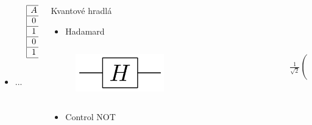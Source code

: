 \documentclass{beamer}
\begin{document}
\begin{frame}
\begin{columns}[t]
\begin{column}{.5\textwidth}
\begin{columns}[c]
\begin{column}{.5\textwidth}
\begin{figure}
					\end{figure}
				\end{column}
				\begin{column}{.5\textwidth}
					\begin{displaymath}
						\begin{array}{|c c|c|}
							\hline
							A & B & Q \\ 
							\hline 
							0 & 0 & 0 \\
							\hline
							1 & 0 & 0 \\
							\hline
							0 & 1 & 0 \\
							\hline
							1 & 1 & 1 \\
							\hline
						\end{array}   
					\end{displaymath}
				\end{column}
			\end{columns}
			\begin{itemize}
				\item ...
			\end{itemize}
			
		\end{column}
		
		\begin{column}{.5\textwidth}
			\centering
			Kvantové hradlá
			\vspace{0.4cm}
			\begin{itemize}
				\item Hadamard
			\end{itemize}
					
			\begin{columns}[c]
				\begin{column}{.5\textwidth}
					\begin{figure}
						\centering
						\includegraphics[width=0.5\textwidth]{hadamard_gate.png}
					\end{figure}
				\end{column}
				
				\begin{column}{.5\textwidth}
					$\frac{1}{\sqrt{2}}\begin{pmatrix}
					1 & 1\\
					1 & -1\\
					\end{pmatrix}$
				\end{column}
			\end{columns}  
			\begin{itemize}
				\item       Control NOT
				      

\end{itemize}
\end{column}
\end{columns}
\end{frame}
\end{document}
